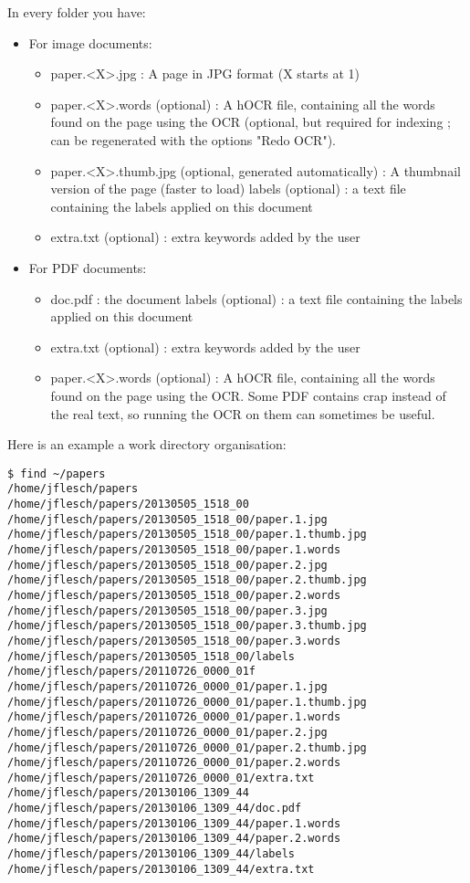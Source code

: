 \documentclass[10pt,a4paper]{article}
\begin{document}
In every folder you have:
\begin{itemize}
\item For image documents:

\begin{itemize}
\item paper.<X>.jpg : A page in JPG format (X starts at 1)
\item paper.<X>.words (optional) : A hOCR file, containing all the words
found on the page using the OCR (optional, but required for indexing
; can be regenerated with the options "Redo OCR").
\item paper.<X>.thumb.jpg (optional, generated automatically) : A thumbnail
version of the page (faster to load) labels (optional) : a text file
containing the labels applied on this document
\item extra.txt (optional) : extra keywords added by the user
\end{itemize}
\item For PDF documents:

\begin{itemize}
\item doc.pdf : the document labels (optional) : a text file containing
the labels applied on this document
\item extra.txt (optional) : extra keywords added by the user
\item paper.<X>.words (optional) : A hOCR file, containing all the words
found on the page using the OCR. Some PDF contains crap instead of
the real text, so running the OCR on them can sometimes be useful.
\end{itemize}
\end{itemize}
Here is an example a work directory organisation:
\begin{verbatim}
$ find ~/papers
/home/jflesch/papers
/home/jflesch/papers/20130505_1518_00
/home/jflesch/papers/20130505_1518_00/paper.1.jpg
/home/jflesch/papers/20130505_1518_00/paper.1.thumb.jpg
/home/jflesch/papers/20130505_1518_00/paper.1.words
/home/jflesch/papers/20130505_1518_00/paper.2.jpg
/home/jflesch/papers/20130505_1518_00/paper.2.thumb.jpg
/home/jflesch/papers/20130505_1518_00/paper.2.words
/home/jflesch/papers/20130505_1518_00/paper.3.jpg
/home/jflesch/papers/20130505_1518_00/paper.3.thumb.jpg
/home/jflesch/papers/20130505_1518_00/paper.3.words
/home/jflesch/papers/20130505_1518_00/labels
/home/jflesch/papers/20110726_0000_01f
/home/jflesch/papers/20110726_0000_01/paper.1.jpg
/home/jflesch/papers/20110726_0000_01/paper.1.thumb.jpg
/home/jflesch/papers/20110726_0000_01/paper.1.words
/home/jflesch/papers/20110726_0000_01/paper.2.jpg
/home/jflesch/papers/20110726_0000_01/paper.2.thumb.jpg
/home/jflesch/papers/20110726_0000_01/paper.2.words
/home/jflesch/papers/20110726_0000_01/extra.txt
/home/jflesch/papers/20130106_1309_44
/home/jflesch/papers/20130106_1309_44/doc.pdf
/home/jflesch/papers/20130106_1309_44/paper.1.words
/home/jflesch/papers/20130106_1309_44/paper.2.words
/home/jflesch/papers/20130106_1309_44/labels
/home/jflesch/papers/20130106_1309_44/extra.txt
\end{verbatim}
\end{document}
